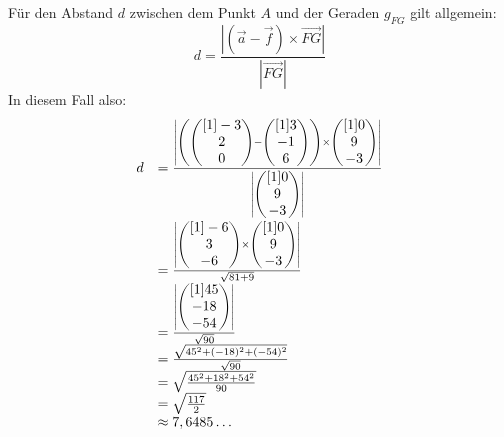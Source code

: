 \documentclass[main.tex]{subfiles}
\begin{document}
Für den Abstand $d$ zwischen dem Punkt $A$ und der Geraden $g_{FG}$ gilt allgemein:
\begin{equation*}
    d=\frac{| (\vec{a} -\vec{f}) \times \overrightarrow{FG}| }{| \overrightarrow{FG}| }
\end{equation*}
In diesem Fall also:
\begin{equation*}
    \begin{array}{ c l }
    d & =\frac{\left| \left(\begin{pmatrix}[1]
    -3\\
    2\\
    0
    \end{pmatrix} -\begin{pmatrix}[1]
    3\\
    -1\\
    6
    \end{pmatrix}\right) \times \begin{pmatrix}[1]
    0\\
    9\\
    -3
    \end{pmatrix}\right| }{\left| \begin{pmatrix}[1]
    0\\
    9\\
    -3
    \end{pmatrix}\right| }\\
    & =\frac{\left| \begin{pmatrix}[1]
    -6\\
    3\\
    -6
    \end{pmatrix} \times \begin{pmatrix}[1]
    0\\
    9\\
    -3
    \end{pmatrix}\right| }{\sqrt{81+9}}\\
    & =\frac{\left| \begin{pmatrix}[1]
    45\\
    -18\\
    -54
    \end{pmatrix}\right| }{\sqrt{90}}\\
    & =\frac{\sqrt{45^{2} +( -18)^{2} +( -54)^{2}}}{\sqrt{90}}\\
    & =\sqrt{\frac{45^{2} +18^{2} +54^{2}}{90}}\\
    & =\sqrt{\frac{117}{2}}\\
    & \approx 7,6485\dotsc 
    \end{array}
\end{equation*}
\end{document}
